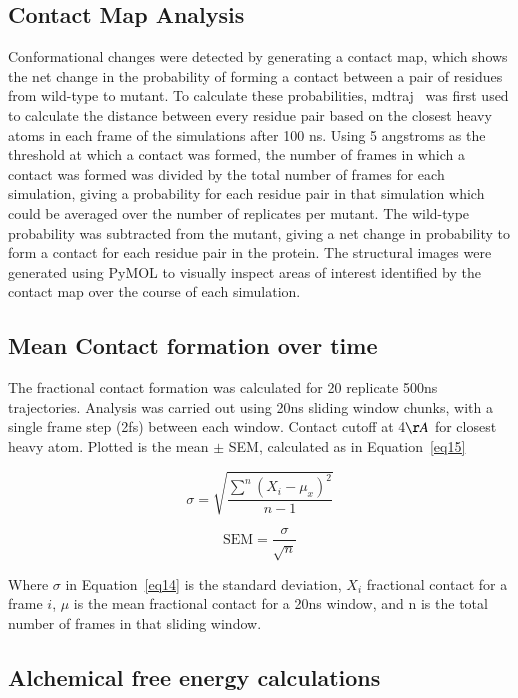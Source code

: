 \documentclass[phd,tocprelim]{cornell}
\begin{document}
\subsection{Contact Map Analysis}
Conformational changes were detected by generating a contact map, which shows the net change in the probability of forming a contact between a pair of residues from wild-type to mutant. To calculate these probabilities, mdtraj~\citep{McGibbon:2015fv} was first used to calculate the distance between every residue pair based on the closest heavy atoms in each frame of the simulations after 100 ns. Using 5 angstroms as the threshold at which a contact was formed, the number of frames in which a contact was formed was divided by the total number of frames for each simulation, giving a probability for each residue pair in that simulation which could be averaged over the number of replicates per mutant. The wild-type probability was subtracted from the mutant, giving a net change in probability to form a contact for each residue pair in the protein. The structural images were generated using PyMOL to visually inspect areas of interest identified by the contact map over the course of each simulation. 

\subsection{Mean Contact formation over time}
The fractional contact formation was calculated for 20 replicate 500ns trajectories. Analysis was carried out using 20ns sliding window chunks, with a single frame step (2fs) between each window.  Contact cutoff at 4$\AA$ for closest heavy atom.  Plotted is the mean $\pm$ SEM, calculated as in Equation~\ref{eq15}

\begin{equation}\label{eq14}
\sigma = \sqrt{\frac{ \sum^n (X_i - \mu_x)^2}{n-1}}
\end{equation}

\begin{equation}\label{eq15}
\text{SEM} = \frac{\sigma}{\sqrt{n}}
\end{equation}

Where $\sigma$ in Equation~\ref{eq14} is the standard deviation, $X_i$ fractional contact for a frame $i$, $\mu$ is the mean fractional contact for a 20ns window, and n is the total number of frames in that sliding window. 

\subsection{Alchemical free energy calculations}
\end{document}

